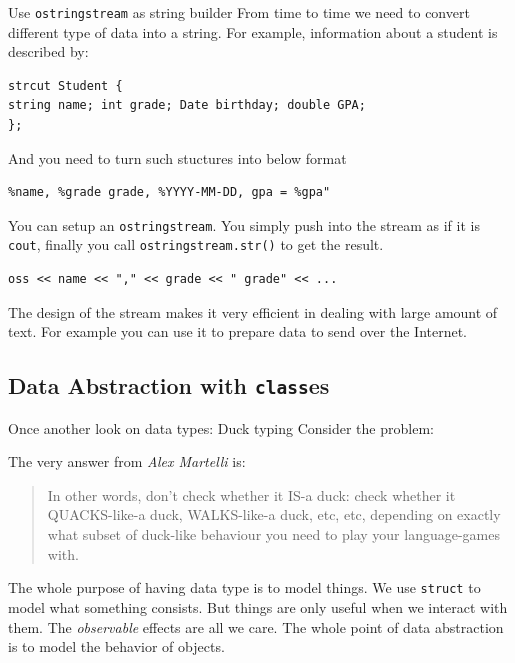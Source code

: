 \begin{frame}[fragile]{Use \texttt{ostringstream} as string builder}
From time to time we need to convert different type of data into a string. For example, information about a student is described by:
\begin{verbatim}
strcut Student {
string name; int grade; Date birthday; double GPA;
};
\end{verbatim}
And you need to turn such stuctures into below format
\begin{verbatim}
%name, %grade grade, %YYYY-MM-DD, gpa = %gpa"
\end{verbatim}
You can setup an \texttt{ostringstream}. You simply push into the stream as if it is \texttt{cout}, finally you call \texttt{ostringstream.str()} to get the result. 
\begin{verbatim}
oss << name << "," << grade << " grade" << ... 
\end{verbatim}
The design of the stream makes it very efficient in dealing with large amount of text. For example you can use it to prepare data to send over the Internet.
\end{frame}

\subsection{Data Abstraction with \texttt{class}es}
\begin{frame}{Once another look on data types: Duck typing}
Consider the problem: 
\begin{center}
\end{center}
The very answer from \textit{Alex Martelli} is:
\begin{quotation}
	In other words, don't check whether it IS-a duck: check whether it QUACKS-like-a duck, WALKS-like-a duck, etc, etc, depending on exactly what subset of duck-like behaviour you need to play your language-games with.
\end{quotation}
The whole purpose of having data type is to model things. We use \texttt{struct} to model what something consists. But things are only useful when we interact with them. The \textit{observable} effects are all we care. \alert{The whole point of data abstraction is to model the behavior of objects}.
\end{frame}


